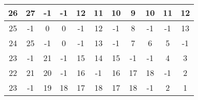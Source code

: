 \documentclass{standalone}
\begin{document}
\begin{tabular}{|c|c|c|c|c|c|c|c|c|c|c|}
\hline
26 &	27 &	-1 &	-1 &	12 &	11 &	10 &	9  &	10 &	11 &	12  \\\hline
25 &	-1 &	0  &     0 &	-1 &	12 &	-1 &	8  &	-1 &	-1 &	13  \\\hline
24 &	25 &	-1 &	 0 &	-1 &	13 &	-1 &	7  &	6  &	5  &	-1  \\\hline
23 &	-1 &	21 &	-1 &	15 &	14 &	15 &	-1 &	-1 &	4  &	3   \\\hline
22 &	21 &	20 &	-1 &	16 &	-1 &	16 &	17 &	18 &	-1 &	2   \\\hline
23 &	-1 &	19 &	18 &	17 &	18 &	17 &	18 &	-1 &	2  &	1	\\\hline
\end{tabular}
\end{document}
